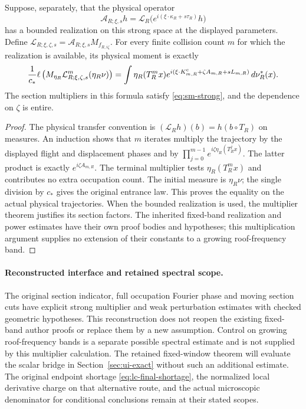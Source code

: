 \begin{corollary}
\label{cor:sm-transfer}
Suppose, separately, that the physical operator
\[
 \mathcal A_{R;\xi,s}h=\mathcal L_R
       \bigl(e^{i(\xi\cdot\kappa_R+s\tau_R)}h\bigr)
\]
has a bounded realization on this strong space at the displayed
parameters. Define
$\mathcal L_{R;\xi,\zeta,s}
 =\mathcal A_{R;\xi,s}M_{f_{R,i\zeta}}$.
For every finite collision count $m$ for which the realization is
available, its physical moment is exactly
\begin{equation}\label{eq:sm-exact-transfer}
 \frac1{c_*}\ell\left(
 M_{\eta_R}\mathcal L_{R;\xi,\zeta,s}^{m}
                         (\eta_R\nu)\right)
 =\int \eta_R(T_R^mx)
 e^{i(\xi\cdot K^{\rm c}_{m,R}+\zeta A_{m,R}+sL_{m,R})}
                 \,d\nu_R^*(x).
\end{equation}
The section multipliers in this formula satisfy
\eqref{eq:sm-strong}, and the dependence on $\zeta$ is entire.
\end{corollary}
\begin{proof}
The physical transfer convention is
$(\mathcal L_Rh)(b)=h(b\circ T_R)$ on measures.
An induction shows that $m$ iterates multiply the trajectory by
the displayed flight and displacement phases and by
$\prod_{j=0}^{m-1}e^{i\zeta\eta_R(T_R^jx)}$.
The latter product is exactly $e^{i\zeta A_{m,R}}$.
The terminal multiplier tests $\eta_R(T_R^mx)$ and contributes
no extra occupation count. The initial measure is $\eta_R\nu$;
the single division by $c_*$ gives the original entrance law.
This proves the equality on the actual physical trajectories.
When the bounded realization is used, the multiplier theorem
justifies its section factors. The inherited fixed-band realization
and power estimates have their own proof bodies and hypotheses;
this multiplication argument supplies no extension of their
constants to a growing roof-frequency band.
\end{proof}

\paragraph{Reconstructed interface and retained spectral scope.}
The original section indicator, full occupation Fourier phase and
moving section cuts have explicit strong multiplier and weak
perturbation estimates with checked geometric hypotheses. This
reconstruction does not reopen the existing fixed-band author
proofs or replace them by a new assumption. Control on growing roof-frequency bands is a separate possible
spectral estimate and is not supplied by this multiplier calculation.
The retained fixed-window theorem will evaluate the scalar bridge
in Section~\ref{sec:ui-exact} without such an additional estimate.
The original endpoint shortage \eqref{eq:lc-final-shortage}, the
normalized local derivative charge on that alternative route, and
the actual microscopic denominator for conditional conclusions
remain at their stated scopes.

